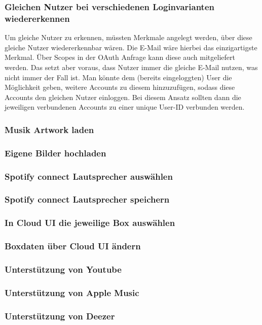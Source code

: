 \documentclass[10pt, a4paper, draft]{article}
\begin{document}
\subsubsection{Gleichen Nutzer bei verschiedenen Loginvarianten wiedererkennen}
Um gleiche Nutzer zu erkennen, müssten Merkmale angelegt werden, über diese gleiche Nutzer wiedererkennbar wären.
Die E-Mail wäre hierbei das einzigartigste Merkmal. Über Scopes in der OAuth Anfrage kann diese auch mitgeliefert werden.
Das setzt aber voraus, dass Nutzer immer die gleiche E-Mail nutzen, was nicht immer der Fall ist.
Man könnte dem (bereits eingeloggten) User die Möglichkeit geben, weitere Accounts zu diesem hinzuzufügen, sodass diese Accounts den gleichen Nutzer einloggen.
Bei diesem Ansatz sollten dann die jeweiligen verbundenen Accounts zu einer unique User-ID verbunden werden.

\subsubsection{Musik Artwork laden}
\subsubsection{Eigene Bilder hochladen}
\subsubsection{Spotify connect Lautsprecher auswählen}
\subsubsection{Spotify connect Lautsprecher speichern}
\subsubsection{In Cloud UI die jeweilige Box auswählen}
\subsubsection{Boxdaten über Cloud UI ändern}
\subsubsection{Unterstützung von Youtube}
\subsubsection{Unterstützung von Apple Music}
\subsubsection{Unterstützung von Deezer}
\end{document}
